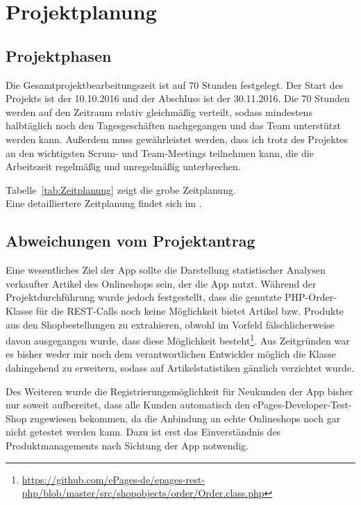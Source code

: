 \section{Projektplanung} 
\label{sec:Projektplanung}


\subsection{Projektphasen}
\label{sec:Projektphasen}

Die Gesamtprojektbearbeitungszeit ist auf 70 Stunden festgelegt. Der Start des Projekts ist der 10.10.2016 und der Abschluss ist der 30.11.2016. Die 70 Stunden werden auf den Zeitraum relativ gleichmäßig verteilt, sodass mindestens halbtäglich noch den Tagesgeschäften nachgegangen und das Team unterstützt werden kann. Außerdem muss gewährleistet werden, dass ich trotz des Projektes an den wichtigsten Scrum- und Team-Meetings teilnehmen kann, die die Arbeitszeit regelmäßig und unregelmäßig unterbrechen.

Tabelle~\ref{tab:Zeitplanung} zeigt die grobe Zeitplanung.
\\
Eine detailliertere Zeitplanung findet sich im .


\subsection{Abweichungen vom Projektantrag}
\label{sec:AbweichungenProjektantrag}

Eine wesentliches Ziel der App sollte die Darstellung statistischer Analysen verkaufter Artikel des Onlineshops sein, der die App nutzt. Während der Projektdurchführung wurde jedoch festgestellt, dass die genutzte \acs{PHP}-Order-Klasse für die \acs{REST}-Calls noch keine Möglichkeit bietet Artikel bzw. Produkte aus den Shopbestellungen zu extrahieren, obwohl im Vorfeld fälschlicherweise davon ausgegangen wurde, dass diese Möglichkeit besteht\footnote{\url{https://github.com/ePages-de/epages-rest-php/blob/master/src/shopobjects/order/Order.class.php}}. Aus Zeitgründen war es bisher weder mir noch dem verantwortlichen Entwickler möglich die Klasse dahingehend zu erweitern, sodass auf Artikelstatistiken gänzlich verzichtet wurde. 

Des Weiteren wurde die Registrierungsmöglichkeit für Neukunden der App bisher nur soweit aufbereitet, dass alle Kunden automatisch den ePages-Developer-Test-Shop zugewiesen bekommen, da die Anbindung an echte Onlineshops noch gar nicht getestet werden kann. Dazu ist erst das Einverständnis des Produktmanagements nach Sichtung der App notwendig.

